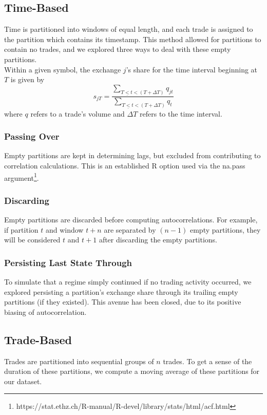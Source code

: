 \documentclass{article}
\begin{document}
\subsection{Time-Based}
Time is partitioned into windows of equal length, and each trade is assigned to the partition which contains its timestamp. This method allowed for partitions to contain no trades, and we explored three ways to deal with these empty partitions.\\

Within a given symbol, the exchange $j$'s share for the time interval beginning at $T$ is given by
$$s_{jT} = \frac{\sum_{T\underline{<}t < (T+\Delta T)} q_{jt}}{\sum_{T\underline{<}t < (T+\Delta T)}q_{t}}$$
where $q$ refers to a trade's volume and $\Delta T$ refers to the time interval.\\

\subsubsection{Passing Over} \label{passoverempty}
Empty partitions are kept in determining lags, but excluded from contributing to correlation calculations. This is an established R option used via the na.pass argument\footnote{https://stat.ethz.ch/R-manual/R-devel/library/stats/html/acf.html}.\\

\subsubsection{Discarding} \label{discardempty}
Empty partitions are discarded before computing autocorrelations. For example, if partition $t$ and window $t + n$ are separated by $(n - 1)$ empty partitions, they will be considered $t$ and $t + 1$ after discarding the empty partitions.\\

\subsubsection{Persisting Last State Through} \label{persistempty}
To simulate that a regime simply continued if no trading activity occurred, we explored persisting a partition's exchange share through its trailing empty partitions (if they existed). This avenue has been closed, due to its positive biasing of autocorrelation.\\

\subsection{Trade-Based}
Trades are partitioned into sequential groups of $n$ trades. To get a sense of the duration of these partitions, we compute a moving average of these partitions for our dataset.\\
\end{document}
